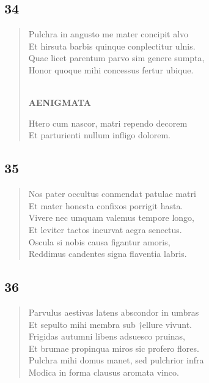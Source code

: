 \documentclass[11pt, a4paper]{report}
\begin{document}
            \subsection*{34}
      \begin{verse}
      Pulchra in angusto me mater concipit alvo \\ Et hirsuta barbis quinque conplectitur ulnis. \\ Quae licet parentum parvo sim genere sumpta, \\ Honor quoque mihi concessus fertur ubique. \\ 
        ﻿\pagebreak 
     \marginpar{[362]} \begin{center} \textbf{AENIGMATA} \end{center}Htero cum nascor, matri rependo decorem \\ Et parturienti nullum infligo dolorem. \\ 
      \end{verse}
  
            \subsection*{35}
      \begin{verse}
      Nos pater occultus conmendat patulae matri \\ Et mater honesta confixos porrigit hasta. \\ Vivere nec umquam valemus tempore longo, \\ Et leviter tactos incurvat aegra senectus. \\ Oscula si nobis causa figantur amoris, \\ Reddimus candentes signa flaventia labris. \\ 
      \end{verse}
  
            \subsection*{36}
      \begin{verse}
      Parvulus aestivas latens abscondor in umbras \\ Et sepulto mihi membra sub †ellure vivunt. \\ Frigidas autumni libens adsuesco pruinas, \\ Et brumae propinqua miros sic profero flores. \\ Pulchra mihi domus manet, sed pulchrior infra \\ Modica in forma clausus aromata vinco. \\ 
      \end{verse}
  
\end{document}

